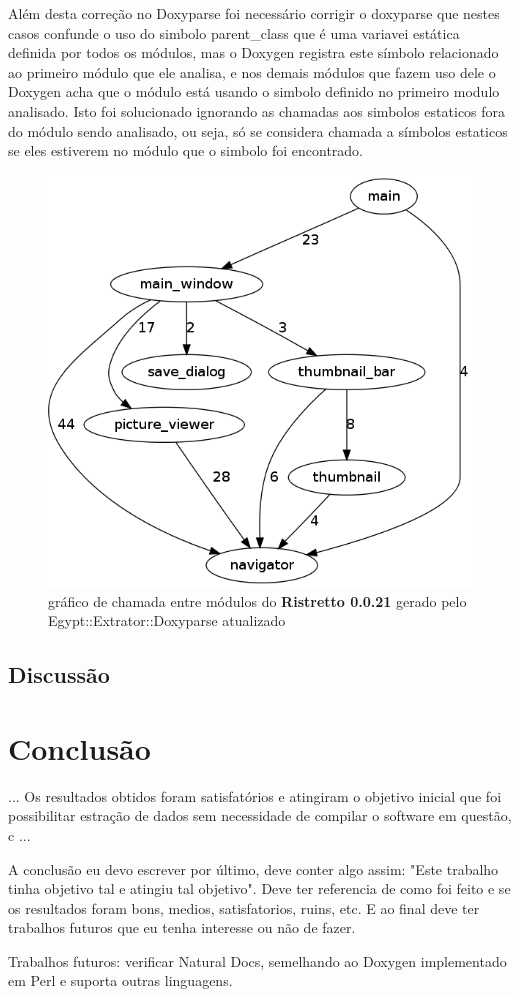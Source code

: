 Além desta correção no Doxyparse foi necessário corrigir o doxyparse
que nestes casos confunde o uso do simbolo parent\_class que é uma variavei estática definida
por todos os módulos, mas o Doxygen registra este símbolo relacionado ao
primeiro módulo que ele analisa, e nos demais módulos que fazem uso dele o
Doxygen acha que o módulo está usando o simbolo definido no primeiro modulo
analisado. Isto foi solucionado ignorando as chamadas aos simbolos estaticos
fora do módulo sendo analisado, ou seja, só se considera chamada a símbolos
estaticos se eles estiverem no módulo que o simbolo foi encontrado.

\begin{figure}
\center
\includegraphics[scale=0.5]{imagens/ristretto-0_0_21-doxyparse-2}
\caption{gráfico de chamada entre módulos do {\bf Ristretto 0.0.21} gerado pelo Egypt::Extrator::Doxyparse atualizado}
\label{ristretto-0.0.21-doxyparse-2}
\end{figure}

\section{Discussão}

\chapter{Conclusão}

... Os resultados obtidos foram satisfatórios e atingiram o objetivo inicial que
foi possibilitar estração de dados sem necessidade de compilar o software em
questão, c ...

A conclusão eu devo escrever por último, deve conter algo assim: "Este trabalho
tinha objetivo tal e atingiu tal objetivo". Deve ter referencia de como foi
feito e se os resultados foram bons, medios, satisfatorios, ruins, etc. E ao
final deve ter trabalhos futuros que eu tenha interesse ou não de fazer.

Trabalhos futuros: verificar Natural Docs, semelhando ao Doxygen implementado
em Perl e suporta outras linguagens.
